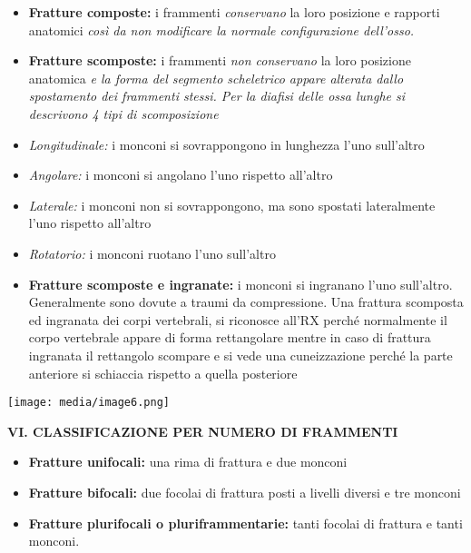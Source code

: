 \documentclass[]{article}
\begin{document}
\begin{itemize}
\item
  \textbf{Fratture composte:} i frammenti \emph{conservano} la loro
  posizione e rapporti anatomici \emph{così da non modificare la normale
  configurazione dell'osso.}
\item
  \textbf{Fratture scomposte:} i frammenti \emph{non conservano} la loro
  posizione anatomica \emph{e la forma del segmento scheletrico appare
  alterata dallo spostamento dei frammenti stessi. Per la diafisi delle
  ossa lunghe si descrivono 4 tipi di scomposizione}
\end{itemize}

\begin{itemize}
\item
  \emph{Longitudinale:} i monconi si sovrappongono in lunghezza l'uno
  sull'altro
\item
  \emph{Angolare:} i monconi si angolano l'uno rispetto all'altro
\item
  \emph{Laterale:} i monconi non si sovrappongono, ma sono spostati
  lateralmente l'uno rispetto all'altro
\item
  \emph{Rotatorio:} i monconi ruotano l'uno sull'altro
\end{itemize}

\begin{itemize}
\item
  \textbf{Fratture scomposte e ingranate:} i monconi si ingranano l'uno
  sull'altro. Generalmente sono dovute a traumi da compressione. Una
  frattura scomposta ed ingranata dei corpi vertebrali, si riconosce
  all'RX perché normalmente il corpo vertebrale appare di forma
  rettangolare mentre in caso di frattura ingranata il rettangolo
  scompare e si vede una cuneizzazione perché la parte anteriore si
  schiaccia rispetto a quella posteriore
\end{itemize}

\texttt{[image: media/image6.png]}

\textbf{VI. CLASSIFICAZIONE PER NUMERO DI FRAMMENTI}

\begin{itemize}
\item
  \textbf{Fratture unifocali:} una rima di frattura e due monconi
\item
  \textbf{Fratture bifocali:} due focolai di frattura posti a livelli
  diversi e tre monconi
\item
  \textbf{Fratture plurifocali o pluriframmentarie:} tanti focolai di
  frattura e tanti monconi.
\end{itemize}
\end{document}
